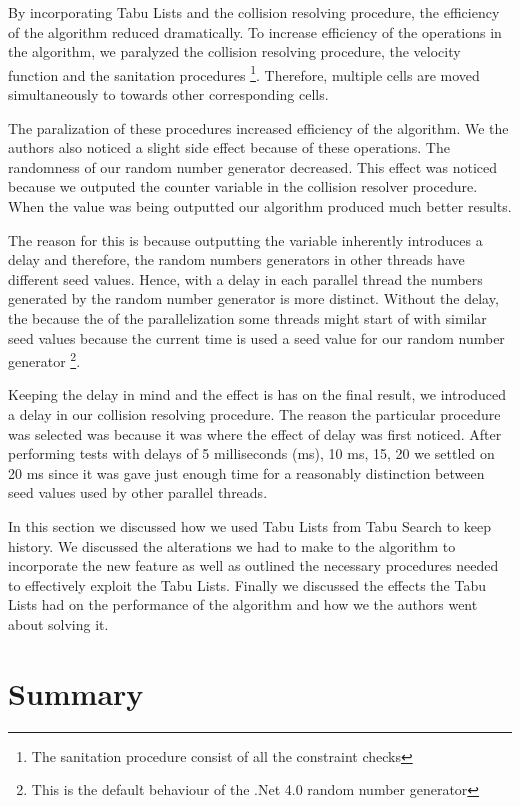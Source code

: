 By incorporating Tabu Lists and the collision resolving procedure, the efficiency of the algorithm reduced dramatically. To increase efficiency of the operations in the algorithm, we paralyzed the collision resolving procedure, the velocity function and the sanitation procedures \footnote{The sanitation procedure consist of all the constraint checks}. Therefore, multiple cells are moved simultaneously to towards other corresponding cells.

The paralization of these procedures increased efficiency of the algorithm. We the authors also noticed a slight side effect because of these operations. The randomness of our random number generator decreased. This effect was noticed because we outputed the counter variable in the collision resolver procedure. When the value was being outputted our algorithm produced much better results. 

The reason for this is because outputting the variable inherently introduces a delay and therefore, the random numbers generators in other threads have different seed values. Hence, with a delay in each parallel thread the numbers generated by the random number generator is more distinct. Without the delay, the because the of the parallelization some threads might start of with similar seed values because the current time is used a seed value for our random number generator \footnote{This is the default behaviour of the .Net 4.0 random number generator}.

Keeping the delay in mind and the effect is has on the final result, we introduced a delay in our collision resolving procedure. The reason the particular procedure was selected was because it was where the effect of delay was first noticed. After performing tests with delays of 5 milliseconds (ms), 10 ms, 15, 20 we settled on 20 ms since it was gave just enough time for a reasonably distinction between seed values used by other parallel threads.

In this section we discussed how we used Tabu Lists from Tabu Search to keep history. We discussed the alterations we had to make to the algorithm to incorporate the new feature as well as outlined the necessary procedures needed to effectively exploit the Tabu Lists. Finally we discussed the effects the Tabu Lists had on the performance of the algorithm and how we the authors went about solving it.

\section{Summary}
